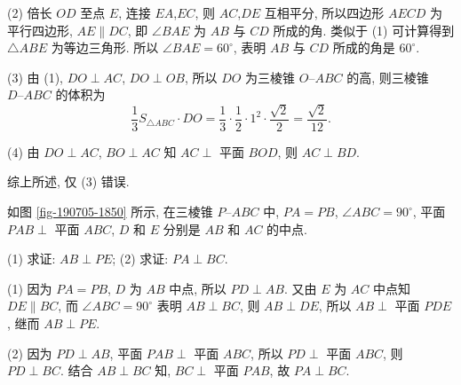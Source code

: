     (2) 倍长 $OD$ 至点 $E$, 连接 $EA$,$EC$, 则 $AC$,$DE$ 互相平分, 所以四边形 $AECD$ 为平行四边形, $AE\parallel DC$, 即 $\angle BAE$ 为 $AB$ 与 $CD$ 所成的角. 类似于 (1) 可计算得到 $\triangle ABE$ 为等边三角形. 所以 $\angle BAE= 60^\circ$, 表明 $AB$ 与 $CD$ 所成的角是 $60^\circ$.

    (3) 由 (1), $DO\perp AC$, $DO\perp OB$, 所以 $DO$ 为三棱锥 $O\text{--}ABC$ 的高, 则三棱锥 $D\text{--}ABC$ 的体积为
    \[\frac13 S_{\triangle ABC}\cdot DO
        = \frac13\cdot \frac12\cdot 1^2\cdot \frac{\sqrt2}2
        = \frac{\sqrt2}{12}.\]

    (4) 由 $DO\perp AC$, $BO\perp AC$ 知 $AC\perp$ 平面 $BOD$, 则 $AC\perp BD$.

    综上所述, 仅 (3) 错误.
\endsolution
  
\begin{exercise}
    如图 \ref{fig-190705-1850} 所示, 在三棱锥 $P\text{--}ABC$ 中, $PA=PB$, $\angle ABC=90^\circ$, 平面 $PAB\perp$ 平面 $ABC$, $D$ 和 $E$ 分别是 $AB$ 和 $AC$ 的中点.
    
    (1) 求证: $AB\perp PE$;\qquad
    (2) 求证: $PA\perp BC$.
\end{exercise}
\beginsolution
    (1) 因为 $PA=PB$, $D$ 为 $AB$ 中点, 所以 $PD\perp AB$. 又由 $E$ 为 $AC$ 中点知 $DE\parallel BC$, 而 $\angle ABC= 90^\circ$ 表明 $AB\perp BC$, 则 $AB\perp DE$, 所以 $AB\perp$ 平面 $PDE$, 继而 $AB\perp PE$.

    (2) 因为 $PD\perp AB$, 平面 $PAB\perp$ 平面 $ABC$, 所以 $PD\perp$ 平面 $ABC$, 则 $PD\perp BC$. 结合 $AB\perp BC$ 知, $BC\perp$ 平面 $PAB$, 故 $PA\perp BC$.
\endsolution

